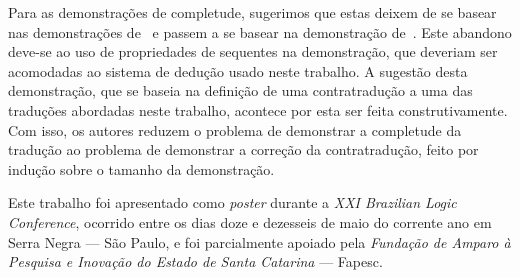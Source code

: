     \vspace{.5\baselineskip}
    Para as demonstrações de completude, sugerimos que estas deixem de se basear nas demonstrações de~\cite{Troelstra+Schwichtenberg.2000} e passem a se basear na demonstração de~\cite{Flagg+Friedman.1986}.
    Este abandono deve-se ao uso de propriedades de sequentes na demonstração, que deveriam ser acomodadas ao sistema de dedução usado neste trabalho.
    A sugestão desta demonstração, que se baseia na definição de uma contratradução a uma das traduções abordadas neste trabalho, acontece por esta ser feita construtivamente.
    Com isso, os autores reduzem o problema de demonstrar a completude da tradução ao problema de demonstrar a correção da contratradução, feito por indução sobre o tamanho da demonstração.

    \vspace{.5\baselineskip}
    Este trabalho foi apresentado como \emph{poster} durante a \emph{XXI Brazilian Logic Conference}, ocorrido entre os dias doze e dezesseis de maio do corrente ano em Serra Negra --- São Paulo, e foi parcialmente apoiado pela \emph{Fundação de Amparo à Pesquisa e Inovação do Estado de Santa Catarina} --- Fapesc.
